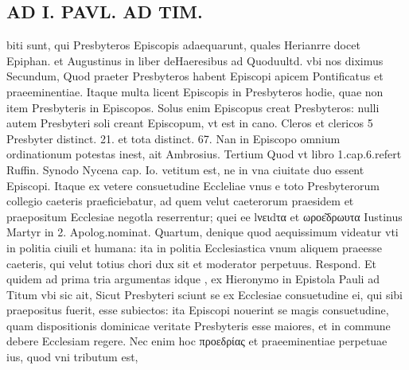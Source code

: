 \documentclass{article}
\begin{document}
\begin{pages}
\section*{AD I. PAVL. AD TIM. }
\marginpar{[ p.96 ]}\pstart biti sunt, qui Presbyteros Episcopis adaequarunt, quales Herianrre docet Epiphan. et Augustinus in liber  deHaeresibus  ad Quoduultd. vbi nos diximus  \pend\pstart Secundum, Quod praeter Presbyteros habent Episcopi apicem Pontificatus et praeeminentiae. Itaque multa licent Episcopis in Presbyteros hodie, quae non item Presbyteris in Episcopos. Solus enim Episcopus creat Presbyteros: nulli autem Presbyteri soli creant Episcopum, vt est in cano. Cleros et clericos 5 Presbyter distinct. 21. et tota distinct. 67. Nan in Episcopo omnium ordinationum potestas inest, ait Ambrosius.  \pend\pstart Tertium Quod vt libro 1.cap.6.refert Ruffin. Synodo Nycena cap. Io. vetitum est, ne in vna ciuitate duo essent Episcopi. Itaque ex vetere consuetudine Eccleliae vnus e toto Presbyterorum collegio caeteris praeficiebatur, ad quem velut caeterorum praesidem et praepositum Ecclesiae negotla reserrentur; quei ee lνειdτα et ωροε͂δρωυτα Iustinus Martyr in 2. Apolog.nominat.  \pend\pstart Quartum, denique quod aequissimum videatur vti in politia ciuili et humana: ita in politia Ecclesiastica vnum aliquem praeesse caeteris, qui velut totius chori dux sit et moderator perpetuus.  \pend\pstart Respond. Et quidem ad prima tria argumentas idque , ex Hieronymo in Epistola Pauli ad Titum vbi sic ait, Sicut Presbyteri sciunt se ex Ecclesiae consuetudine ei, qui sibi praepositus fuerit, esse subiectos: ita Episcopi nouerint se magis consuetudine, quam dispositionis dominicae veritate Presbyteris esse maiores, et in commune debere Ecclesiam regere. Nec enim hoc προεδρίας et praeeminentiae perpetuae ius, quod vni tributum est,  \pend

\end{pages}
\end{document}
